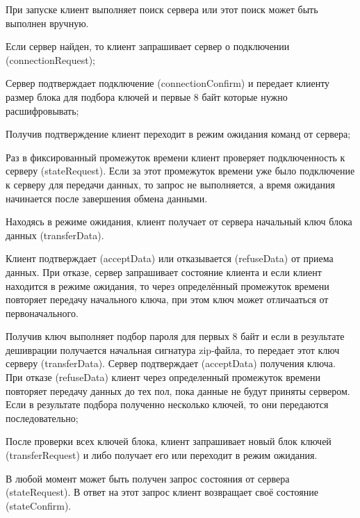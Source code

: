 
\begin{DoxyEnumerate}
\item При запуске клиент выполняет поиск сервера или этот поиск может быть выполнен вручную.
\item Если сервер найден, то клиент запрашивает сервер о подключении (connection\+Request);
\item Сервер подтверждает подключение (connection\+Confirm) и передает клиенту размер блока для подбора ключей и первые 8 байт которые нужно расшифровывать;
\item Получив подтверждение клиент переходит в режим ожидания команд от сервера;
\item Раз в фиксированный промежуток времени клиент проверяет подключенность к серверу (state\+Request). Если за этот промежуток времени уже было подключение к серверу для передачи данных, то запрос не выполняется, а время ожидания начинается после завершения обмена данными.
\item Находясь в режиме ожидания, клиент получает от сервера начальный ключ блока данных (transfer\+Data).
\item Клиент подтверждает (accept\+Data) или отказывается (refuse\+Data) от приема данных. При отказе, сервер запрашивает состояние клиента и если клиент находится в режиме ожидания, то через определённый промежуток времени повторяет передачу начального ключа, при этом ключ может отличааться от первоначального.
\item Получив ключ выполняет подбор пароля для первых 8 байт и если в результате дешиврации получается начальная сигнатура zip-\/файла, то передает этот ключ серверу (transfer\+Data). Сервер подтверждает (accept\+Data) получения ключа. При отказе (refuse\+Data) клиент через определенный промежуток времени повторяет передачу данных до тех пол, пока данные не будут приняты сервером. Если в результате подбора полученно несколько ключей, то они передаются последовательно;
\item После проверки всех ключей блока, клиент запрашивает новый блок ключей (transfer\+Request) и либо получает его или переходит в режим ожидания.
\item В любой момент может быть получен запрос состояния от сервера (state\+Request). В ответ на этот запрос клиент возвращает своё состояние (state\+Confirm). 
\end{DoxyEnumerate}